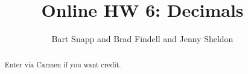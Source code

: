 \documentclass[handout,space,nooutcomes]{xourse}
\title{Online HW 6: Decimals}
\author{Bart Snapp and Brad Findell and Jenny Sheldon}
\begin{document}
\begin{abstract}
Enter via Carmen if you want credit.
\end{abstract}
\maketitle


\end{document}
